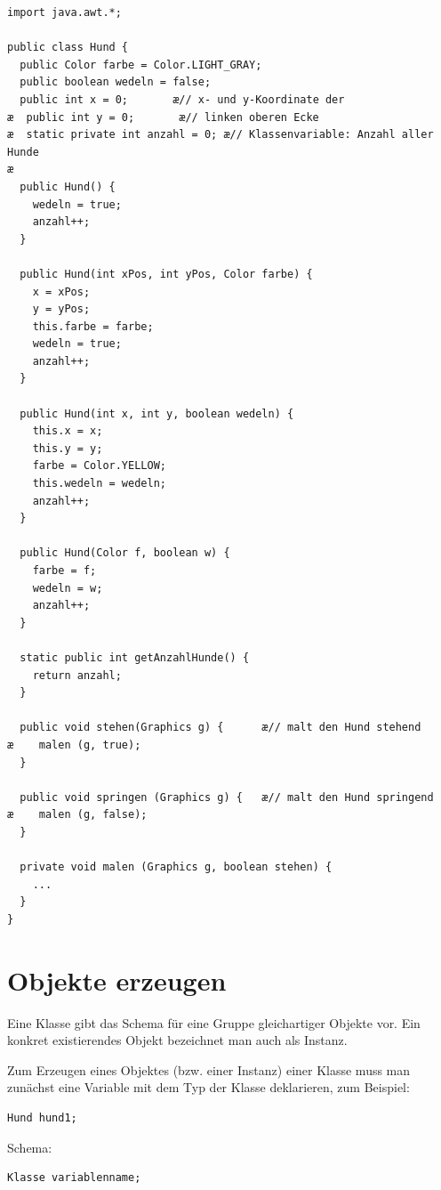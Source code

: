 \vspace{1mm}

\begin{lstlisting}
import java.awt.*;

public class Hund {
  public Color farbe = Color.LIGHT_GRAY;
  public boolean wedeln = false;
  public int x = 0;       æ// x- und y-Koordinate der
æ  public int y = 0;       æ// linken oberen Ecke
æ  static private int anzahl = 0; æ// Klassenvariable: Anzahl aller Hunde
æ
  public Hund() {
    wedeln = true;
    anzahl++;
  }

  public Hund(int xPos, int yPos, Color farbe) {
    x = xPos;
    y = yPos;
    this.farbe = farbe;
    wedeln = true;
    anzahl++;
  }

  public Hund(int x, int y, boolean wedeln) {
    this.x = x;
    this.y = y;
    farbe = Color.YELLOW;
    this.wedeln = wedeln;
    anzahl++;
  }

  public Hund(Color f, boolean w) {
    farbe = f;
    wedeln = w;
    anzahl++;
  }

  static public int getAnzahlHunde() {
    return anzahl;
  }

  public void stehen(Graphics g) {      æ// malt den Hund stehend
æ    malen (g, true);
  }
  
  public void springen (Graphics g) {   æ// malt den Hund springend
æ    malen (g, false);
  }

  private void malen (Graphics g, boolean stehen) {
    ...
  }
}
\end{lstlisting}


\section{Objekte erzeugen}

Eine Klasse gibt das Schema für eine Gruppe gleichartiger Objekte vor. Ein
konkret existierendes Objekt bezeichnet man auch als Instanz.

Zum Erzeugen eines Objektes (bzw. einer Instanz) einer Klasse muss man zunächst
eine Variable mit dem Typ der Klasse deklarieren, zum Beispiel:

\begin{lstlisting}
Hund hund1;
\end{lstlisting}

Schema:

\begin{lstlisting}
Klasse variablenname;
\end{lstlisting}


